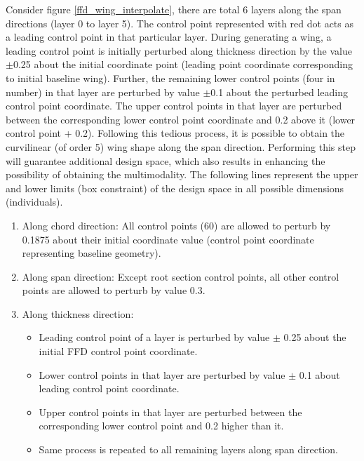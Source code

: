 Consider figure \ref{ffd_wing_interpolate}, there are total 6 layers along the span directions (layer 0 to layer 5). The control point represented with red dot acts as a leading control point in that particular layer. During generating a wing, a leading control point is initially perturbed along thickness direction by the value $ \pm $0.25 about the initial coordinate point (leading point coordinate corresponding to initial baseline wing). Further, the remaining lower control points (four in number) in that layer are perturbed by value $\pm$0.1 about the perturbed leading control point coordinate. The upper control points in that layer are perturbed between the corresponding lower control point coordinate and 0.2 above it (lower control point + 0.2). Following this tedious process, it is possible to obtain the curvilinear (of order 5) wing shape along the span direction. Performing this step will guarantee additional design space, which also results in enhancing the possibility of obtaining the multimodality. The following lines represent the upper and lower limits (box constraint) of the design space in all possible dimensions (individuals).

\begin{enumerate}
\item Along chord direction: All control points (60) are allowed to perturb by 0.1875 about their initial coordinate value (control point coordinate representing baseline geometry).
\item Along span direction: Except root section control points, all other control points are allowed to perturb by value 0.3.
\item Along thickness direction: 
\begin{itemize}
\item Leading control point of a layer is perturbed by value  $\pm$ 0.25 about the initial FFD control point coordinate.
\item Lower control points in that layer are perturbed by value $\pm$ 0.1 about leading control point coordinate.
\item Upper control points in that layer are perturbed between the corresponding lower control point and 0.2 higher than it.  
\item Same process is repeated to all remaining layers along span direction.
\end{itemize}
\end{enumerate}

